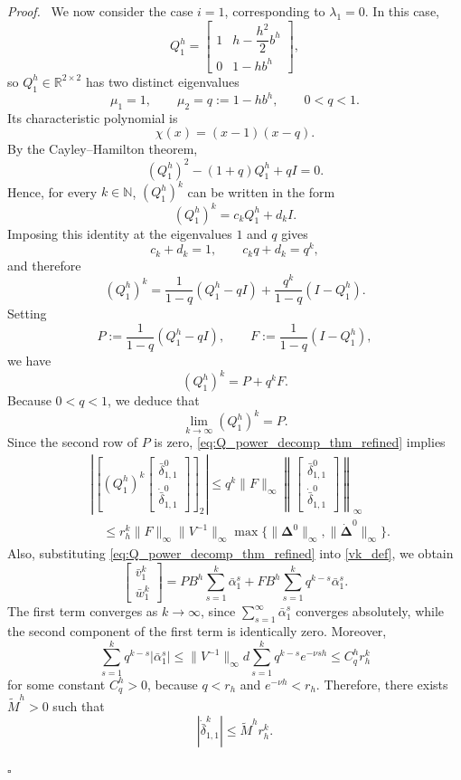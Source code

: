 \documentclass[letterpaper,journal]{IEEEtran}
\newenvironment{proof}{\par\noindent\textit{Proof.}\ }{\hfill$\square$\par}
\begin{document}
\begin{proof}
We now consider the case \(i=1\), corresponding to \(\lambda_1=0\). In this case,
\[
Q_1^h=
\begin{bmatrix}
1 & h-\dfrac{h^2}{2}b^h\\[6pt]
0 & 1-hb^h
\end{bmatrix},
\]
so \(Q_1^h\in\mathbb R^{2\times2}\) has two distinct eigenvalues
\[
\mu_1=1,
\qquad
\mu_2=q:=1-hb^h,
\qquad 0<q<1.
\]
Its characteristic polynomial is
\[
\chi(x)=(x-1)(x-q).
\]
By the Cayley--Hamilton theorem,
\[
(Q_1^h)^2-(1+q)Q_1^h+qI=0.
\]
Hence, for every \(k\in\mathbb N\), \((Q_1^h)^k\) can be written in the form
\[
(Q_1^h)^k=c_k Q_1^h+d_k I.
\]
Imposing this identity at the eigenvalues \(1\) and \(q\) gives
\[
c_k+d_k=1,
\qquad
c_k q+d_k=q^k,
\]
and therefore
\[
(Q_1^h)^k
=
\frac{1}{1-q}(Q_1^h-qI)+\frac{q^k}{1-q}(I-Q_1^h).
\]
Setting
\[
P:=\frac{1}{1-q}(Q_1^h-qI),
\qquad
F:=\frac{1}{1-q}(I-Q_1^h),
\]
we have
\begin{equation}\label{eq:Q_power_decomp_thm_refined}
(Q_1^h)^k=P+q^kF.
\end{equation}
Because $0<q<1$, we deduce that
\[
\lim_{k\to\infty}(Q_1^h)^k=P.
\]
Since the second row of \(P\) is zero, \eqref{eq:Q_power_decomp_thm_refined} implies
\[
\begin{split}
&\left|
\left[
(Q_1^h)^k
\begin{bmatrix}
\bar{\delta}_{1,1}^{0}\\[5pt]
\dot{\bar{\delta}}_{1,1}^{0}
\end{bmatrix}
\right]_2
\right|
\le
q^k\|F\|_\infty
\left\|
\begin{bmatrix}
\bar{\delta}_{1,1}^{0}\\[5pt]
\dot{\bar{\delta}}_{1,1}^{0}
\end{bmatrix}
\right\|_\infty
\\&\quad\le
r_h^k\|F\|_\infty\|V^{-1}\|_\infty
\max\{\|\bm{\Delta}^0\|_\infty,\|\dot{\bm{\Delta}}^0\|_\infty\}.
\end{split}
\]
Also, substituting \eqref{eq:Q_power_decomp_thm_refined} into \eqref{vk_def}, we obtain
\[
\begin{bmatrix}
\bar{v}_1^k \\[5pt]
\bar{w}_1^k
\end{bmatrix}
=
PB^h\sum_{s=1}^{k}\bar{\alpha}_1^s
+
FB^h\sum_{s=1}^{k}q^{k-s}\bar{\alpha}_1^s.
\]
The first term converges as \(k\to\infty\), since \(\sum_{s=1}^\infty \bar{\alpha}_1^s\) converges absolutely, while the second component of the first term is identically zero. Moreover,
\[
\sum_{s=1}^{k} q^{k-s}|\bar{\alpha}_1^s|
\le
\|V^{-1}\|_\infty d
\sum_{s=1}^{k} q^{k-s}e^{-\nu sh}
\le C_q^h r_h^k
\]
for some constant \(C_q^h>0\), because \(q<r_h\) and \(e^{-\nu h}<r_h\). Therefore, there exists \(\widetilde M^h>0\) such that
\[
|\dot{\bar{\delta}}_{1,1}^{k}|
\le
\widetilde M^h r_h^k.
\]


\end{proof}
\end{document}
